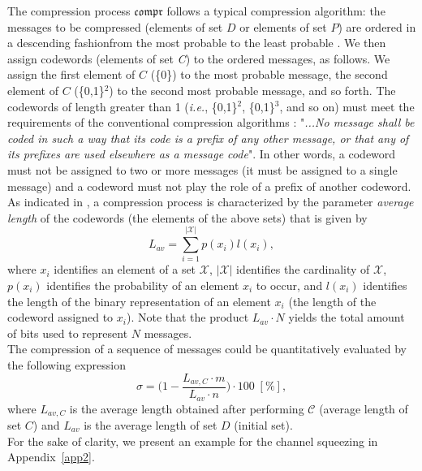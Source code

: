 \documentclass[journal,onecolumn]{IEEEtran}
\theoremstyle{thmstyleone}%
\theoremstyle{thmstyletwo}%
\theoremstyle{thmstylethree}%
\begin{document}
	\indent The compression process $\mathfrak{compr}$ follows a typical compression algorithm: the messages to be compressed (elements of set $D$ or elements of set $P$) are ordered in a descending fashion\textemdash from the most probable to the least probable \cite{Huffman1952}. We then assign codewords (elements of set \textit{C}) to the ordered messages, as follows. We assign the first element of $C$ (\{0\}) to the most probable message, the second element of $C$ (\{0,1\}$^{\text{2}}$) to the second most probable message, and so forth. The codewords of length greater than 1 (\textit{\textit{i.e.}}, \{0,1\}$^{\text{2}}$, \{0,1\}$^{\text{3}}$, and so on) must meet the requirements of the conventional compression algorithms \cite{Huffman1952}: "\textit{...No message shall be coded in such a way that its code is a prefix of any other message, or that any of its prefixes are used elsewhere as a message code}". In other words, a codeword must not be assigned to two or more messages (it must be assigned to a single message) and a codeword must not play the role of a prefix of another codeword.  \\
	\indent As indicated in \cite{Huffman1952}, a compression process is characterized by the parameter \textit{average length} of the codewords (the elements of the above sets) that is given by
	\begin{equation}
		L_{av} = \sum_{i=\text{1}}^{|\mathcal{X}|} p(x_i)l(x_i),
	\end{equation}
	where $x_i$ identifies an element of a set $\mathcal{X}$, $|\mathcal{X}|$ identifies the cardinality of $\mathcal{X}$, $p(x_i)$ identifies the probability of an element $x_i$ to occur, and $l(x_i)$ identifies the length of the binary representation of an element $x_i$ (the length of the codeword assigned to $x_i$). Note that the product $L_{av} \cdot N$ yields the total amount of bits used to represent $N$ messages. \\
	\indent The compression of a sequence of messages could be quantitatively evaluated by the following expression
	\begin{equation}\label{sigma}
		\sigma = \Big(\text{1} - \frac{L_{av,C}\cdot m}{L_{av}\cdot n}\Big)\cdot \text{100}\; [\%],
	\end{equation}
	where $L_{av,C}$ is the average length obtained after performing $\mathcal{C}$ (average length of set $C$) and $L_{av}$ is the average length of set $D$ (initial set). \\
	\indent For the sake of clarity, we present an example for the channel squeezing in Appendix~\ref{app2}. 
\end{document}
